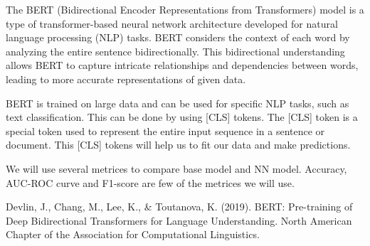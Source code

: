 \documentclass[conference]{IEEEtran}
\begin{document}
The BERT (Bidirectional Encoder Representations from Transformers) model is a type of transformer-based neural network architecture developed for natural language processing (NLP) tasks. BERT considers the context of each word by analyzing the entire sentence bidirectionally. This bidirectional understanding allows BERT to capture intricate relationships and dependencies between words, leading to more accurate representations of given data.

BERT is trained on large data and can be used for specific NLP tasks, such as text classification. This can be done by using \cite{bert}[CLS] tokens. The [CLS] token is a special token used to represent the entire input sequence in a sentence or document. This [CLS] tokens will help us to fit our data and make predictions.

We will use several metrices to compare base model and NN model. Accuracy, AUC-ROC curve and F1-score are few of the metrices we will use.

\begin{thebibliography}{00}
 Devlin, J., Chang, M., Lee, K., \& Toutanova, K. (2019). BERT: Pre-training of Deep Bidirectional Transformers for Language Understanding. North American Chapter of the Association for Computational Linguistics.
\end{thebibliography}
\end{document}
